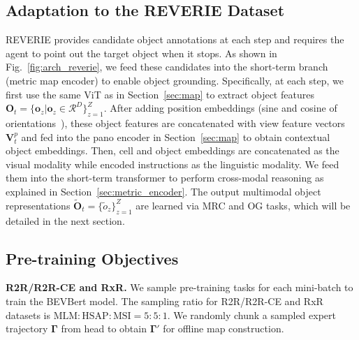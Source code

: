 \subsection{Adaptation to the REVERIE Dataset}
REVERIE provides candidate object annotations at each step and requires the agent to point out the target object when it stops.
As shown in Fig.~\ref{fig:arch_reverie}, we feed these candidates into the short-term branch (metric map encoder) to enable object grounding. 
Specifically, at each step, we first use the same ViT as in Section~\ref{sec:map} to extract object features $\mathbf{O}_t=\{ \mathbf{o}_z | \mathbf{o}_z \in \mathcal{R}^D \}_{z=1}^Z$.
After adding position embeddings (sine and cosine of orientations~\cite{hong2021vln,chen2022think,lin2021scene}), these object features are concatenated with view feature vectors $\mathbf{V}_{t}^{p}$ and fed into the pano encoder in Section~\ref{sec:map} to obtain contextual object embeddings. 
Then, cell and object embeddings are concatenated as the visual modality while encoded instructions as the linguistic modality.
We feed them into the short-term transformer to perform cross-modal reasoning as explained in Section~\ref{sec:metric_encoder}.
The output multimodal object representations $\widetilde{\mathbf{O}}_t = \{ \tilde{o}_z \}_{z=1}^{Z}$ are learned via MRC and OG tasks, which will be detailed in the next section.



\subsection{Pre-training Objectives}\label{sec:pretrain_reverie}
\noindent\textbf{R2R/R2R-CE and RxR.} We sample pre-training tasks for each mini-batch to train the BEVBert model. The sampling ratio for R2R/R2R-CE and RxR datasets is $\textrm{MLM}:\textrm{HSAP}:\textrm{MSI}=5:5:1$.
We randomly chunk a sampled expert trajectory $\mathbf{\Gamma}$ from head to obtain $\mathbf{\Gamma'}$ for offline map construction. 



